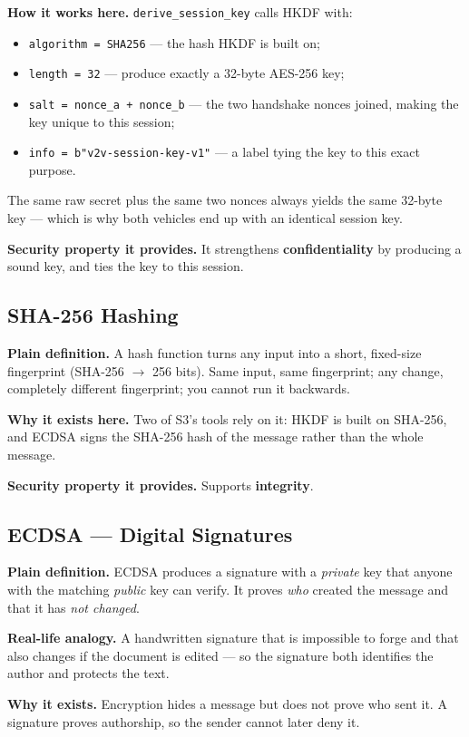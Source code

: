 \documentclass[11pt,a4paper]{report}
\begin{document}
\textbf{How it works here.} \texttt{derive\_session\_key} calls HKDF with:
\begin{itemize}
  \item \texttt{algorithm = SHA256} --- the hash HKDF is built on;
  \item \texttt{length = 32} --- produce exactly a 32-byte AES-256 key;
  \item \texttt{salt = nonce\_a + nonce\_b} --- the two handshake nonces joined,
        making the key unique to this session;
  \item \texttt{info = b"v2v-session-key-v1"} --- a label tying the key to this
        exact purpose.
\end{itemize}
The same raw secret plus the same two nonces always yields the same 32-byte key
--- which is why both vehicles end up with an identical session key.

\textbf{Security property it provides.} It strengthens \textbf{confidentiality}
by producing a sound key, and ties the key to this session.

\subsection{SHA-256 Hashing}
\textbf{Plain definition.} A hash function turns any input into a short,
fixed-size fingerprint (SHA-256 $\to$ 256 bits). Same input, same fingerprint;
any change, completely different fingerprint; you cannot run it backwards.

\textbf{Why it exists here.} Two of S3's tools rely on it: HKDF is built on
SHA-256, and ECDSA signs the SHA-256 hash of the message rather than the whole
message.

\textbf{Security property it provides.} Supports \textbf{integrity}.

\subsection{ECDSA --- Digital Signatures}
\textbf{Plain definition.} ECDSA produces a signature with a \emph{private} key
that anyone with the matching \emph{public} key can verify. It proves \emph{who}
created the message and that it has \emph{not changed}.

\textbf{Real-life analogy.} A handwritten signature that is impossible to forge
and that also changes if the document is edited --- so the signature both
identifies the author and protects the text.

\textbf{Why it exists.} Encryption hides a message but does not prove who sent
it. A signature proves authorship, so the sender cannot later deny it.
\end{document}
